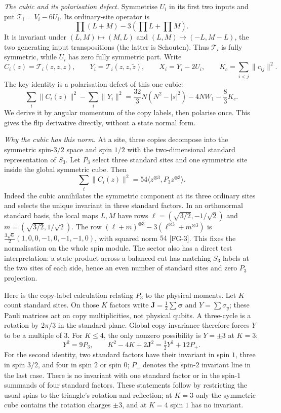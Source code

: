 \emph{The cubic and its polarisation defect.}
Symmetrise $U_i$ in its first two inputs and put $\mathcal T_i=V_i-6U_i$.
Its ordinary-site operator is
\[
 \prod(L+M)-3(\prod L+\prod M).
\]
It is invariant under $(L,M)\mapsto(M,L)$ and
$(L,M)\mapsto(-L,M-L)$, the two generating input transpositions
(the latter is Schouten). Thus $\mathcal T_i$ is fully symmetric, while
$U_i$ has zero fully symmetric part. Write
\[
 C_i(z)=\mathcal T_i(z,z,z),\qquad
 Y_i=\mathcal T_i(z,z,\tilde z),\qquad X_i=Y_i-2U_i,
 \qquad K_c=\sum_{i<j}\|c_{ij}\|^2.
\]
The key identity is a polarisation defect of this one cubic:
\[
 \boxed{\quad \sum_i\|C_i(z)\|^2-\sum_i\|Y_i\|^2
 =\frac{32}{3}N(N^2-|s|^2)-4NW_1-\frac83K_c.\quad}
 \tag{CP}\label{eq:fqe-cubic-polarization-defect}
\]
We derive it by angular momentum of the copy labels, then polarise once.
This gives the flip derivative directly, without a state normal form.

\emph{Why the cubic has this norm.}
At a site, three copies decompose into the symmetric spin-$3/2$ space
and spin $1/2$ with the two-dimensional standard representation of $S_3$.
Let $P_3$ select three standard sites and one symmetric site inside the
global symmetric cube. Then
\[
 \sum_i\|C_i(z)\|^2=54\langle z^{\otimes3},P_3z^{\otimes3}\rangle.
\]
Indeed the cubic annihilates the symmetric component at its three ordinary
sites and selects the unique invariant in three standard factors.
In an orthonormal standard basis, the local maps $L,M$ have rows
$\ell=(\sqrt{3/2},-1/\sqrt2)$ and $m=(\sqrt{3/2},1/\sqrt2)$.
The row $(\ell+m)^{\otimes3}-3(\ell^{\otimes3}+m^{\otimes3})$ is
$\frac{3\sqrt6}{2}(1,0,0,-1,0,-1,-1,0)$, with squared norm $54$ [FG-3].
This fixes the normalisation on the whole spin module.
The sector also has a direct test interpretation: a state product across
a balanced cut has matching $S_3$ labels at the two sites of each side,
hence an even number of standard sites and zero $P_3$ projection.

Here is the copy-label calculation relating $P_3$ to the physical moments.
Let $K$ count standard sites. On those $K$ factors write
$\mathbf J=\frac12\sum\boldsymbol\sigma$ and $Y=\sum\sigma_y$;
these Pauli matrices act on copy multiplicities, not physical qubits.
A three-cycle is a rotation by $2\pi/3$ in the standard plane.
Global copy invariance therefore forces $Y$ to be a multiple of $3$.
For $K\le4$, the only nonzero possibility is $Y=\pm3$ at $K=3$:
\[
 Y^2=9P_3,\qquad
 K^2-4K+2\mathbf J^2=\tfrac12Y^2+12P_+ .
\]
For the second identity, two standard factors have their invariant in
spin $1$, three in spin $3/2$, and four in spin $2$ or spin $0$;
$P_+$ denotes the spin-$2$ invariant line in the last case.
There is no invariant with one standard factor or in the spin-$1$
summands of four standard factors.
These statements follow by restricting the usual spins to the triangle's
rotation and reflection; at $K=3$ only the symmetric cube contains the
rotation charges $\pm3$, and at $K=4$ spin $1$ has no invariant.

